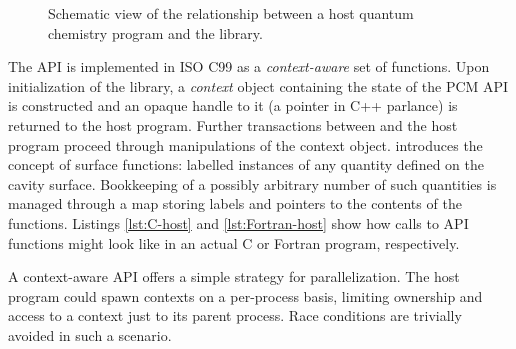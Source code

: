\begin{figure}[tb]
  \centering
  \scalebox{0.7}{}
  \caption[Schematic view of the relationship between a host quantum chemistry
  program and the \pcmsolver library.]{
  Schematic view of the relationship between a host quantum chemistry
  program and the \pcmsolver library.
  }
  \label{fig:pcmsolver-scheme}
\end{figure}

The \acrshort{API} is implemented in ISO C99 as a \emph{context-aware} set of
functions.\autocite{library-ronacher, context-api-example}
Upon initialization of the library, a \emph{context} object containing
the state of the \acrshort{PCM} \acrshort{API} is constructed and an
opaque handle to it (a pointer in C++ parlance) is returned to the host
program. Further transactions between \pcmsolver and the host program
proceed through manipulations of the context object.
\pcmsolver introduces the concept of surface functions:
labelled instances of any quantity defined on the cavity surface.
Bookkeeping of a possibly arbitrary number of such quantities is managed
through a map storing labels and pointers to the contents of the
functions.
Listings \ref{lst:C-host} and \ref{lst:Fortran-host} show how calls to
\pcmsolver \acrshort{API} functions might look like in an actual C or Fortran
program, respectively.



A context-aware \acrshort{API} offers a simple strategy for parallelization.
The host program could spawn contexts on a per-process basis,
limiting ownership and access to a context just to its parent process.
Race conditions are trivially avoided in such a scenario.



